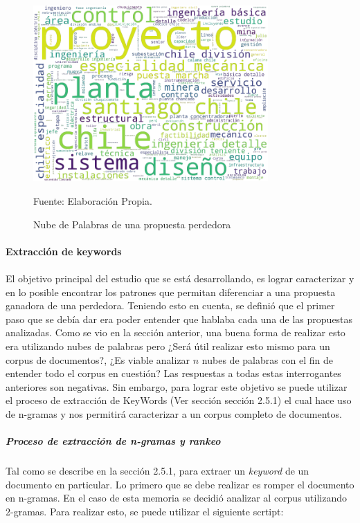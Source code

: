 \begin{figure}[H]
\centering
\includegraphics[width=0.8\textwidth]{figures/KeyWords/nube_perdedora.png}
\caption{\label{fig:nube_perdedora} Nube de Palabras de una propuesta perdedora} Fuente: Elaboración Propia.
\end{figure}

\paragraph{Extracción de keywords}
\paragraph*{}
    El objetivo principal del estudio que se está desarrollando, es lograr caracterizar y en lo posible encontrar los patrones que permitan diferenciar a una propuesta ganadora de una perdedora. Teniendo esto en cuenta, se definió que el primer paso que se debía dar era poder entender que hablaba cada una de las propuestas analizadas. Como se vio en la sección anterior, una buena forma de realizar esto era utilizando nubes de palabras pero ¿Será útil realizar esto mismo para un corpus de documentos?, ¿Es viable analizar $n$ nubes de palabras con el fin de entender todo el corpus en cuestión? Las respuestas a todas estas interrogantes anteriores son negativas. Sin embargo, para lograr este objetivo se puede utilizar el proceso de extracción de KeyWords (Ver sección sección 2.5.1) el cual hace uso de n-gramas y nos permitirá caracterizar a un corpus completo de documentos.

\subparagraph{Proceso de extracción de n-gramas y rankeo}
\subparagraph*{}
    Tal como se describe en la sección 2.5.1, para extraer un \textit{keyword} de un documento en particular. Lo primero que se debe realizar es romper el documento en n-gramas. En el caso de esta memoria se decidió analizar al corpus utilizando 2-gramas. Para realizar esto, se puede utilizar el siguiente scrtipt:

